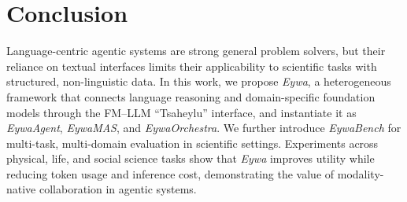 \section{Conclusion}

Language-centric agentic systems are strong general problem solvers, but their reliance on textual interfaces limits their applicability to scientific tasks with structured, non-linguistic data.
In this work, we propose \textit{Eywa}, a heterogeneous framework that connects language reasoning and domain-specific foundation models through the FM--LLM ``Tsaheylu'' interface, and instantiate it as \textit{EywaAgent}, \textit{EywaMAS}, and \textit{EywaOrchestra}.
We further introduce \textit{EywaBench} for multi-task, multi-domain evaluation in scientific settings.
Experiments across physical, life, and social science tasks show that \textit{Eywa} improves utility while reducing token usage and inference cost, demonstrating the value of modality-native collaboration in agentic systems.


